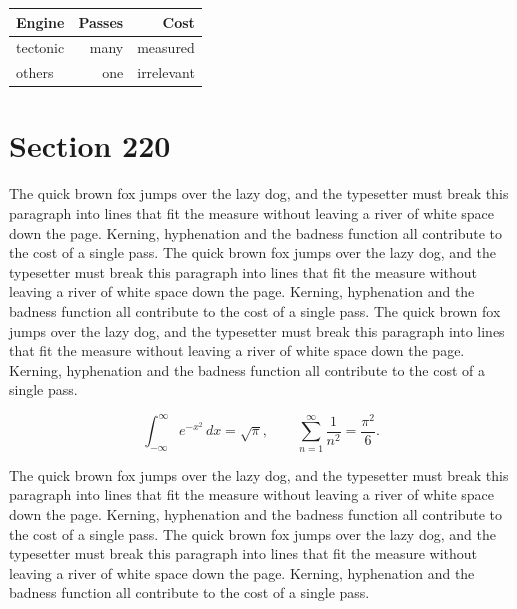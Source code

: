 \documentclass{article}
\begin{document}
\begin{center}
\begin{tabular}{lrr}
\toprule
Engine & Passes & Cost \\
\midrule
tectonic & many & measured \\
others & one & irrelevant \\
\bottomrule
\end{tabular}
\end{center}

\section{Section 220}
The quick brown fox jumps over the lazy dog, and the typesetter must break this paragraph into lines that fit the measure without leaving a river of white space down the page. Kerning, hyphenation and the badness function all contribute to the cost of a single pass. The quick brown fox jumps over the lazy dog, and the typesetter must break this paragraph into lines that fit the measure without leaving a river of white space down the page. Kerning, hyphenation and the badness function all contribute to the cost of a single pass. The quick brown fox jumps over the lazy dog, and the typesetter must break this paragraph into lines that fit the measure without leaving a river of white space down the page. Kerning, hyphenation and the badness function all contribute to the cost of a single pass. 

\begin{equation}
\int_{-\infty}^{\infty} e^{-x^{2}}\,dx = \sqrt{\pi}, \qquad
\sum_{n=1}^{\infty} \frac{1}{n^{2}} = \frac{\pi^{2}}{6}.
\end{equation}

The quick brown fox jumps over the lazy dog, and the typesetter must break this paragraph into lines that fit the measure without leaving a river of white space down the page. Kerning, hyphenation and the badness function all contribute to the cost of a single pass. The quick brown fox jumps over the lazy dog, and the typesetter must break this paragraph into lines that fit the measure without leaving a river of white space down the page. Kerning, hyphenation and the badness function all contribute to the cost of a single pass. 
\end{document}
